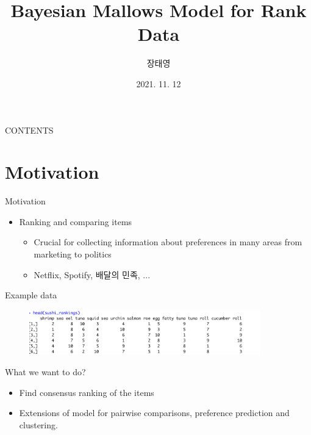 \documentclass[11pt]{beamer}
\title[Mallows Rank Model]{
Bayesian Mallows Model for Rank Data}
\author{
장태영
}
\institute[서울대학교] %
{
  서울대학교\\
  통계학과, 베이즈통계 연구실
}
\date{2021. 11. 12}
\begin{document}
\begin{frame}
  \titlepage
\end{frame}

\begin{frame}{CONTENTS}
  \tableofcontents
\end{frame}

\section{Motivation}
\begin{frame}{Motivation}
\begin{itemize}
    \item Ranking and comparing items
    \begin{itemize}
        \item Crucial for collecting information about preferences in many areas from marketing to politics
        \item Netflix, Spotify, 배달의 민족, ...  
    \end{itemize}
\end{itemize}
\end{frame}

\begin{frame}{Example data}
    \begin{figure}[h]
        \includegraphics[width=10cm]{sushidata.png}
        \centering
    \end{figure}
\end{frame}

\begin{frame}{What we want to do?}
    \begin{itemize}
        \item Find consensus ranking of the items
        \item Extensions of model for pairwise comparisons, preference prediction and clustering.
    \end{itemize}
\end{frame}
\end{document}

